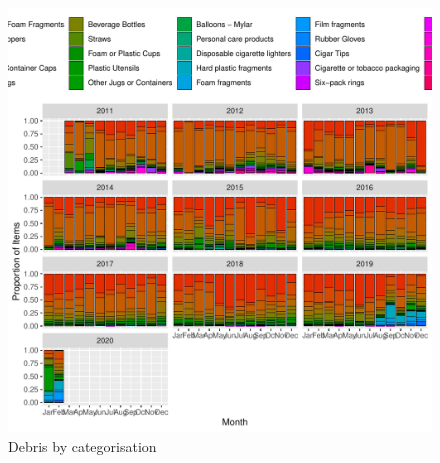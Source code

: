 \documentclass[10pt]{article}\usepackage[]{graphicx}\usepackage[]{color}
\makeatletter
\def\maxwidth{ %
  \ifdim\Gin@nat@width>\linewidth
    \linewidth
  \else
    \Gin@nat@width
  \fi
}
\newenvironment{knitrout}{}{} %
\makeatother
\begin{document}
\begin{figure}[H] %
\begin{center}
\begin{knitrout}
\color{fgcolor}
\includegraphics[width=\maxwidth]{figure/unnamed-chunk-7-1} 

\end{knitrout}
\caption {Debris by categorisation}
\label{figE}
\end {center}
\end {figure}
\end{document}
